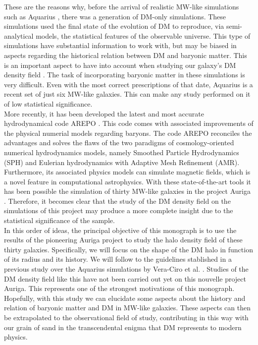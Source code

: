 \documentclass[12pt]{article}
\begin{document}
These are the reasons why, before the arrival of realistic MW-like simulations such as Aquarius \cite{aquarius}, there was a generation of DM-only simulations.
These simulations used the final state of the evolution of DM to reproduce, via semi-analytical models, the statistical features of the observable universe. 
This type of simulations have substantial information to work with, but may be biased in aspects regarding the historical relation between DM and baryonic matter.
This is an important aspect to have into account when studying our galaxy's DM density field \cite{Bryan2012}.
The task of incorporating baryonic matter in these simulations is very difficult.
Even with the most correct prescriptions of that date, Aquarius is a recent set of just six MW-like galaxies.
This can make any study performed on it of low statistical significance.\\

More recently, it has been developed the latest and most accurate hydrodynamical code AREPO \cite{arepo}. 
This code comes with associated improvements of the physical numerial models regarding baryons. 
The code AREPO reconciles the advantages and solves the flaws of the two paradigms of cosmology-oriented numerical hydrodynamics models, namely Smoothed Particle Hydrodynamics (SPH) and Eulerian hydrodynamics with Adaptive Mesh Refinement (AMR). 
Furthermore, its associated physics models can simulate magnetic fields, which is a novel feature in computational astrophysics. 
With these state-of-the-art tools it has been possible the simulation of thirty MW-like galaxies in the project Auriga \cite{auriga}.
Therefore, it becomes clear that the study of the DM density field on the simulations of this project may produce a more complete insight due to the statistical significance of the sample.
\\

In this order of ideas, the principal objective of this monograph is to use the results of the pioneering Auriga project \cite{auriga} to study the halo density field of these thirty galaxies.
Specifically, we will focus on the shape of the DM halo in function of its radius and its history.
We will follow to the guidelines stablished in a previous study over the Aquarius simulations by Vera-Ciro et al. \cite{Vera-Ciro2011}. 
Studies of the DM density field like this have not been carried out yet on this nouvelle project Auriga.
This represents one of the strongest motivations of this monograph.
Hopefully, with this study we can elucidate some aspects about the history and relation of baryonic matter and DM in MW-like galaxies.
These aspects can then be extrapolated to the observational field of study, contributing in this way with our grain of sand in the transcendental enigma that DM represents to modern physics.\\
\end{document}
